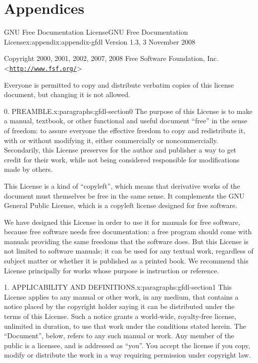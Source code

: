 \documentclass[twoside,10pt,]{book}
\numberwithin{equation}{part}
\begin{document}
\part*{Appendices}%
%
%
\typeout{************************************************}
\typeout{************************************************}
%
\begin{appendixptx}{GNU Free Documentation License}{}{GNU Free Documentation License}{}{}{x:appendix:appendix-gfdl}
Version 1.3, 3 November 2008%
\par
Copyright \textcopyright{} 2000, 2001, 2002, 2007, 2008 Free Software Foundation, Inc. \textless{}\href{http://www.fsf.org/}{\nolinkurl{http://www.fsf.org/}}\textgreater{}%
\par
Everyone is permitted to copy and distribute verbatim copies of this license document, but changing it is not allowed.%
\begin{paragraphs}{0. PREAMBLE.}{x:paragraphs:gfdl-section0}%
The purpose of this License is to make a manual, textbook, or other functional and useful document ``free'' in the sense of freedom: to assure everyone the effective freedom to copy and redistribute it, with or without modifying it, either commercially or noncommercially. Secondarily, this License preserves for the author and publisher a way to get credit for their work, while not being considered responsible for modifications made by others.%
\par
This License is a kind of ``copyleft'', which means that derivative works of the document must themselves be free in the same sense. It complements the GNU General Public License, which is a copyleft license designed for free software.%
\par
We have designed this License in order to use it for manuals for free software, because free software needs free documentation: a free program should come with manuals providing the same freedoms that the software does. But this License is not limited to software manuals; it can be used for any textual work, regardless of subject matter or whether it is published as a printed book. We recommend this License principally for works whose purpose is instruction or reference.%
\end{paragraphs}%
\begin{paragraphs}{1. APPLICABILITY AND DEFINITIONS.}{x:paragraphs:gfdl-section1}%
This License applies to any manual or other work, in any medium, that contains a notice placed by the copyright holder saying it can be distributed under the terms of this License. Such a notice grants a world-wide, royalty-free license, unlimited in duration, to use that work under the conditions stated herein. The ``Document'', below, refers to any such manual or work. Any member of the public is a licensee, and is addressed as ``you''. You accept the license if you copy, modify or distribute the work in a way requiring permission under copyright law.%

\end{paragraphs}
\end{appendixptx}
\end{document}
